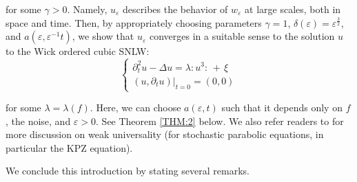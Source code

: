 \documentclass[letterpaper, 11pt,  reqno]{amsart}
\newcommand{\1}{\hspace{0.5mm}\text{I}\hspace{0.5mm}}
\newcommand{\noi}{\noindent}
\newcommand{\Dl}{\Delta}
\newcommand{\eps}{\varepsilon}
\newcommand{\g}{\gamma}
\newcommand{\ld}{\lambda}
\newcommand{\dt}{\partial_t}
\numberwithin{equation}{section}
\numberwithin{theorem}{section}
\begin{document}
\noi
for some $\g > 0$.
Namely, $u_\eps$ describes the behavior of $w_\eps$ at large scales, 
both in space and time.
Then, by appropriately choosing 
 parameters  $\g = 1$,   $\delta(\eps) = \eps^{\frac 32}$, and
 $a (\eps, \eps^{-1} t)$, 
 we show that $u_\eps$ converges in a suitable sense to 
  the solution $u$ to the Wick ordered cubic SNLW:
  \begin{equation*}
\begin{cases}
\dt^2 u - \Dl  u = \lambda : \!u^3 \!: \, + \, \xi\\
 (u, \dt u) |_{t = 0} = (0, 0)
\end{cases}
  \end{equation*}

\noi
for some $\ld = \ld(f)$.
Here, we can choose  
 $a(\eps, t)$ such that it depends only on $f$, the noise, and $\eps > 0$.
See Theorem \ref{THM:2} below.
We also refer readers to 
\cite{HQ, GP1, GP2} for more discussion on weak universality 
(for stochastic parabolic equations, in particular the KPZ equation).

\medskip

We conclude this introduction by stating several remarks.
\end{document}
